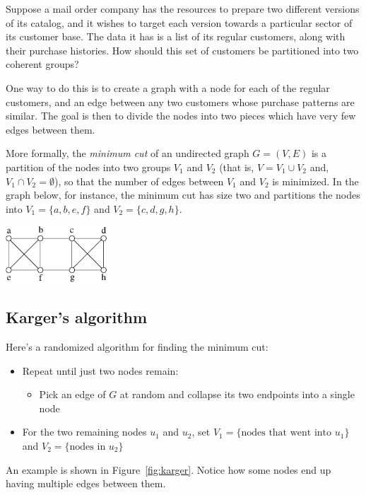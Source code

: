 Suppose a mail order company has the resources to prepare two different versions of 
its catalog, and it wishes to target each version towards a particular sector of its 
customer base. The data it has is a list of its regular customers, along with their 
purchase histories. How should this set of customers be partitioned into two coherent 
groups?

One way to do this is to create a graph with a node for each of the regular customers,
and an edge between any two customers whose purchase patterns are similar. The goal is
then to divide the nodes into two pieces which have very few edges between them.

More formally, the {\it minimum cut} of an undirected graph $G = (V,E)$ is a partition
of the nodes into two groups $V_1$ and $V_2$ (that is, $V = V_1 \cup V_2$ and, 
$V_1 \cap V_2 = \emptyset$), so that the number of edges between $V_1$ and $V_2$ is
minimized. In the graph below, for instance, the minimum cut has size two and partitions
the nodes into $V_1 = \{a,b,e,f\}$ and $V_2 = \{c,d,g,h\}$.

\begin{center}
\includegraphics[width=1.5in]{figs/mincut}
\end{center}

\subsection{Karger's algorithm}

Here's a randomized algorithm for finding the minimum cut:

\begin{itemize}
\item Repeat until just two nodes remain:
\begin{itemize}
\item Pick an edge of $G$ at random and collapse its two endpoints into a single node
\end{itemize}
\item For the two remaining nodes $u_1$ and $u_2$, set 
$V_1 = \{\mbox{nodes that went into $u_1$}\}$ and 
$V_2 = \{\mbox{nodes in $u_2$}\}$
\end{itemize}
An example is shown in Figure~\ref{fig:karger}. Notice
how some nodes end up having multiple edges between them.

